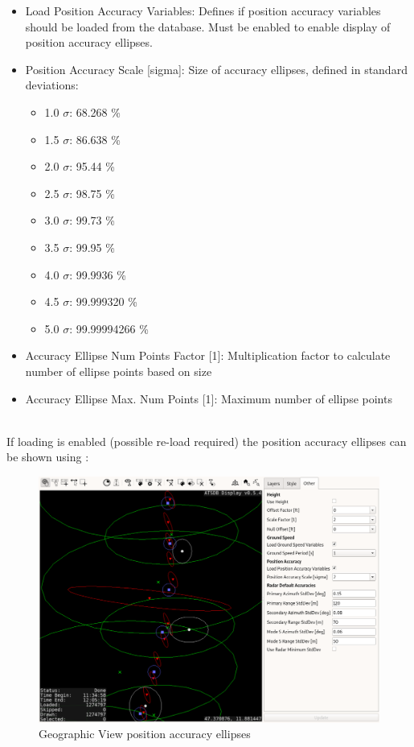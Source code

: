 \begin{itemize}
 \item Load Position Accuracy Variables: Defines if position accuracy variables should be loaded from the database. Must be enabled to enable display of position accuracy ellipses.
 \item Position Accuracy Scale [sigma]: Size of accuracy ellipses, defined in standard deviations:
 \begin{itemize}
    \item 1.0 $\sigma$: 68.268 \%
    \item 1.5 $\sigma$: 86.638 \%
    \item 2.0 $\sigma$: 95.44 \%
    \item 2.5 $\sigma$: 98.75 \%
    \item 3.0 $\sigma$: 99.73 \%
    \item 3.5 $\sigma$: 99.95 \%
    \item 4.0 $\sigma$: 99.9936 \%
    \item 4.5 $\sigma$: 99.999320 \%
    \item 5.0 $\sigma$: 99.99994266 \%
\end{itemize}  
\item Accuracy Ellipse Num Points Factor [1]: Multiplication factor to calculate number of ellipse points based on size
\item Accuracy Ellipse Max. Num Points [1]: Maximum number of ellipse points
\end{itemize}
\ \\

If loading is enabled (possible re-load required) the position accuracy ellipses can be shown using :

\begin{figure}[H]
    \hspace*{-2.5cm}
    \includegraphics[width=19cm,frame]{figures/geoview_accuracy_ellipses.png}
  \caption{Geographic View position accuracy ellipses}
\end{figure} 

